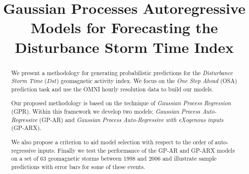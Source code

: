 \documentclass[draft,sw]{AGUTeX}
\begin{document}
%
%


\title{Gaussian Processes Autoregressive Models for Forecasting the Disturbance Storm Time Index}







\begin{abstract}
We present a methodology for generating probabilistic predictions for the \emph{Disturbance Storm Time} ($Dst$) geomagnetic activity index. We focus on the \emph{One Step Ahead} (OSA) prediction task and use the OMNI hourly resolution data to build our models.

Our proposed methodology is based on the technique of \emph{Gaussian Process Regression} (GPR). Within this framework we develop two models; \emph{Gaussian Process Auto-Regressive} (GP-AR) and \emph{Gaussian Process Auto-Regressive with eXogenous inputs} (GP-ARX). 

We also propose a criterion to aid model selection with respect to the order of auto-regressive inputs. Finally we test the performance of the GP-AR and GP-ARX models on a set of 63 geomagnetic storms between 1998 and 2006 and illustrate sample predictions with error bars for some of these events.

\end{abstract}

%
%

%
\end{document}
